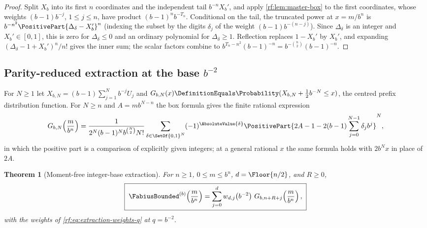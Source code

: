 \documentclass[11pt,oneside]{article}
\theoremstyle{plain}
\newtheorem{theorem}{Theorem}[section]
\theoremstyle{definition}
\theoremstyle{remark}
\newcommand{\Fb}{\FabiusBounded}            %
\newcommand{\Prob}{\Probability}
\newcommand{\Tr}[1]{T_{#1}}                 %
\begin{document}
\begin{proof}
Split $X_{b}$ into its first $n$ coordinates and the independent tail
$b^{-n}X_{b}'$, and apply \cref{rf:lem:master-box} to the first
coordinates, whose weights $(b-1)b^{-j}$, $1\le j\le n$, have product
$(b-1)^{n}b^{-\Tr{n}}$.  Conditional on the tail, the truncated power at
$x=m/b^{n}$ is $b^{-n^{2}}\PositivePart{\Delta_{\delta}-X_{b}'}^{n}$
(indexing the subset by the digits $\delta_{j}$ of the weight
$(b-1)b^{-(n-j)}$).  Since $\Delta_{\delta}$ is an integer and
$X_{b}'\in[0,1]$, this is zero for $\Delta_{\delta}\le0$ and an ordinary
polynomial for $\Delta_{\delta}\ge1$.  Reflection replaces $1-X_{b}'$ by
$X_{b}'$, and expanding $(\Delta_{\delta}-1+X_{b}')^{n}/n!$ gives the inner
sum; the scalar factors combine to $b^{\Tr{n}-n^{2}}(b-1)^{-n}=b^{-\binom{n}{2}}(b-1)^{-n}$.
\end{proof}

\subsection{Parity-reduced extraction at the base $b^{-2}$}
\label{rf:sec:base-extraction}

For $N\ge1$ let $X_{b,N}=(b-1)\sum_{j=1}^{N}b^{-j}U_{j}$ and
$G_{b,N}(x)\DefinitionEquals\Prob(X_{b,N}+\tfrac12b^{-N}\le x)$, the centred
prefix distribution function.  For $N\ge n$ and $A=mb^{N-n}$ the box
formula gives the finite rational expression
\begin{equation}
 G_{b,N}\!\left(\frac{m}{b^{n}}\right)
 =\frac{1}{2^{N}(b-1)^{N}b^{\binom{N}{2}}N!}
 \sum_{\delta\in\SetOf{0,1}^{N}}(-1)^{\AbsoluteValue{\delta}}
 \PositivePart{2A-1-2(b-1)\sum_{j=0}^{N-1}\delta_{j}b^{j}}^{N},
 \label{rf:eq:base-spline}
\end{equation}
in which the positive part is a comparison of explicitly given integers;
at a general rational $x$ the same formula holds with
$2b^{N}x$ in place of $2A$.

\begin{theorem}[Moment-free integer-base extraction]
\label{rf:thm:base-extraction}
For $n\ge1$, $0\le m\le b^{n}$, $d=\Floor{n/2}$, and $R\ge0$,
\begin{equation}
 \boxed{\;
 \Fb^{(b)}\!\left(\frac{m}{b^{n}}\right)
 =\sum_{j=0}^{d}w_{d,j}\!\left(b^{-2}\right)\,G_{b,n+R+j}\!\left(\frac{m}{b^{n}}\right),\;}
 \label{rf:eq:base-extraction}
\end{equation}
with the weights of \cref{rf:eq:extraction-weights-q} at $q=b^{-2}$.
\end{theorem}
\end{document}
